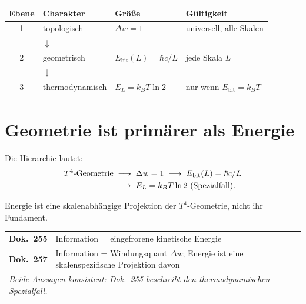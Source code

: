 \begin{center}
\renewcommand{\arraystretch}{1.6}
\begin{tabular}{clll}
\toprule
\textbf{Ebene} & \textbf{Charakter} & \textbf{Größe} & \textbf{Gültigkeit} \\
\midrule
1 & topologisch  & \(\Delta w = 1\)               & universell, alle Skalen \\
  & \(\downarrow\) & & \\
2 & geometrisch  & \(E_\text{bit}(L) = \hbar c/L\) & jede Skala \(L\) \\
  & \(\downarrow\) & & \\
3 & thermodynamisch & \(E_L = k_BT\ln2\)          & nur wenn \(E_\text{bit} = k_BT\) \\
\bottomrule
\end{tabular}
\end{center}

\section{Geometrie ist primärer als Energie}

Die Hierarchie lautet:
\begin{align}
  T^4\text{-Geometrie} \;&\longrightarrow\;
  \Delta w = 1 \;\longrightarrow\;
  E_\text{bit}(L) = \hbar c / L \notag\\
  &\longrightarrow\;
  E_L = k_BT\ln 2 \text{ (Spezialfall)}.
\end{align}

Energie ist eine skalenabhängige Projektion der \(T^4\)-Geometrie,
nicht ihr Fundament.

\begin{center}
\renewcommand{\arraystretch}{1.4}
\begin{tabular}{lp{8cm}}
\toprule
\textbf{Dok.~255} & Information = eingefrorene kinetische Energie \\
\textbf{Dok.~257} & Information = Windungsquant \(\Delta w\);
                    Energie ist eine skalenspezifische Projektion davon \\
\midrule
\multicolumn{2}{l}{\textit{Beide Aussagen konsistent:
Dok.~255 beschreibt den thermodynamischen Spezialfall.}} \\
\bottomrule
\end{tabular}
\end{center}

